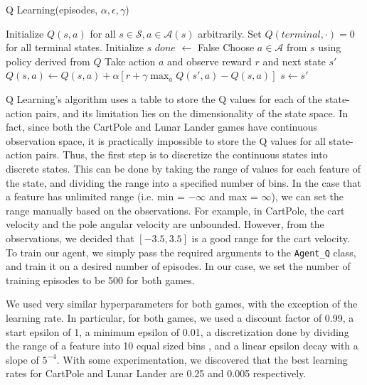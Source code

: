 \documentclass{article}
\begin{document}
\begin{algorithm}[H]
      \caption{Q Learning(episodes, \(\alpha, \epsilon, \gamma\))}
      \label{alg:qlearning}
      \begin{algorithmic}[1]
            \State Initialize \(Q(s,a)\) for all \(s \in \mathcal{S}, a \in \mathcal{A}(s)\) arbitrarily.
            \State Set \(Q(terminal, \cdot) = 0 \) for all terminal states.
            \State Initialize \(s\)
            \State \(done\) \(\leftarrow\) False
            \State Choose \(a \in \mathcal{A}\) from \(s\) using policy derived from \(Q\) 
            \State Take action \(a\) and observe reward \(r\) and next state \(s'\)
            \State \(Q(s, a) \leftarrow Q(s, a) + \alpha \left[r + \gamma \max_{a} Q(s', a) - Q(s, a)\right]\) 
            \State \(s \leftarrow s'\)
            \EndWhile
            \EndFor
      \end{algorithmic}
\end{algorithm}

Q Learning's algorithm uses a table to store the Q values for each of the
state-action pairs, and its limitation lies on the dimensionality of the state
space. In fact, since both the CartPole and Lunar Lander games have continuous
observation space, it is practically impossible to store the Q values for all
state-action pairs. Thus, the first step is to discretize the continuous states
into discrete states. This can be done by taking the range of values for each
feature of the state, and dividing the range into a specified number of bins.
In the case that a feature has unlimited range (i.e. min = \(-\infty\) and max
= \(\infty\)), we can set the range manually based on the observations. For
example, in CartPole, the cart velocity and the pole angular velocity are
unbounded. However, from the observations, we decided that \([-3.5, 3.5]\) is a
good range for the cart velocity. To train our agent, we simply pass the
required arguments to the \verb+Agent_Q+ class, and train it on a desired
number of episodes. In our case, we set the number of training episodes to be
500 for both games.

We used very similar hyperparameters for both games, with the exception of the
learning rate. In particular, for both games, we used a discount factor of
0.99, a start epsilon of 1, a minimum epsilon of 0.01, a discretization done by
dividing the range of a feature into 10 equal sized bins
\cite{discretization_tech}, and a linear epsilon decay with a slope of
\(5^{-4}\). With some experimentation, we discovered that the best learning
rates for CartPole and Lunar Lander are 0.25 and 0.005 respectively.
\end{document}
